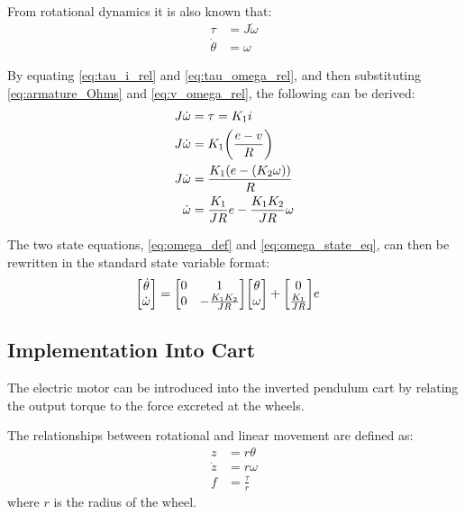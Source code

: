 \documentclass[]{article}
\begin{document}
		From rotational dynamics it is also known that:
		\begin{align}
			\tau &= J \dot{\omega} \label{eq:tau_omega_rel}\\
			\dot{\theta} &= \omega \label{eq:omega_def}
		\end{align}
		
		By equating \eqref{eq:tau_i_rel} and \eqref{eq:tau_omega_rel}, and then substituting \eqref{eq:armature_Ohms} and \eqref{eq:v_omega_rel}, the following can be derived:
		\begin{align}
			 J \dot{\omega}	&= \tau = K_1 i \nonumber\\
			 J \dot{\omega}	&= K_1 \qty(\frac{e-v}{R}) \nonumber\\
			 J \dot{\omega}	&= \frac{K_1 \qty(e - \qty(K_2 \omega))}{R} \nonumber\\
			 \dot{\omega}	&= \frac{K_1}{JR} e - \frac{K_1 K_2}{JR} \omega \label{eq:omega_state_eq}
		\end{align}
		
		The two state equations, \eqref{eq:omega_def} and \eqref{eq:omega_state_eq}, can then be rewritten in the standard state variable format:
		\begin{align}
			\mqty[	\dot{\theta}\\
					\dot{\omega}]
					&= \mqty[	0	&1\\
								0	&-\frac{K_1 K_2}{J R}]
						\mqty[	\theta\\
								\omega]
						+ \mqty[0\\
								\frac{K_1}{J R}] e \label{eq:DesignApp2_state_eq}
		\end{align}
	
	\subsection{Implementation Into Cart}\label{sec:p4_2}
		The electric motor can be introduced into the inverted pendulum cart by relating the output torque to the force excreted at the wheels.
		
		The relationships between rotational and linear movement are defined as:
		\begin{align}
			z &= r \theta \label{eq:z_theta_rel}\\
			\dot{z} &= r \omega \label{eq:zdot_omega_rel}\\
			f &= \frac{\tau}{r} \label{eq:f_tau_rel}
		\end{align}
		where $r$ is the radius of the wheel.
		
\end{document}
